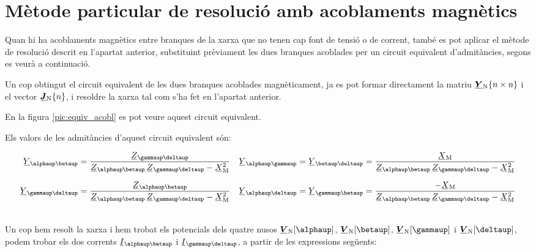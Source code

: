 \section{Mètode particular de resolució amb acoblaments magnètics}

Quan hi ha acoblaments magnètics entre branques de la xarxa que no
tenen cap font de tensió o de corrent, també es pot aplicar el
mètode de resolució descrit en l'apartat anterior, substituint
prèviament les dues branques acoblades per un circuit equivalent
d'admitàncies, segons es veurà a continuació. 

Un cop obtingut el circuit equivalent de les dues branques acoblades
magnèticament, ja es pot formar directament la matriu $\mcmplx{Y}\ped{N}\{n \times n\}$ i
el vector $\mcmplx{J}\ped{N}\{n\}$, i  resoldre la xarxa tal com s'ha fet en
l'apartat anterior.

En la figura \vref{pic:equiv_acobl} es pot veure aquest circuit
equivalent.
\begin{center}
\centering
   
    \label{pic:equiv_acobl}
\end{center}

Els valors de les admitàncies d'aquest circuit equivalent
són:

\parbox{15cm}
{ \begin{align*}
   \cmplx{Y}_{\alphaup\betaup} &= \frac{\cmplx{Z}_{\gammaup\deltaup}}{\cmplx{Z}_{\alphaup\betaup}\, \cmplx{Z}_{\gammaup\deltaup}-\cmplx{X}\ped{M}^2} &
   \cmplx{Y}_{\alphaup\gammaup} &= \cmplx{Y}_{\betaup\deltaup} = \frac{\cmplx{X}\ped{M}}{\cmplx{Z}_{\alphaup\betaup}\, \cmplx{Z}_{\gammaup\deltaup}-\cmplx{X}\ped{M}^2} \\[1.5ex]
   \cmplx{Y}_{\gammaup\deltaup} &= \frac{\cmplx{Z}_{\alphaup\betaup}}{\cmplx{Z}_{\alphaup\betaup}\, \cmplx{Z}_{\gammaup\deltaup}-\cmplx{X}\ped{M}^2} &
   \cmplx{Y}_{\alphaup\deltaup} &= \cmplx{Y}_{\gammaup\betaup} = \frac{-\cmplx{X}\ped{M}}{\cmplx{Z}_{\alphaup\betaup}\, \cmplx{Z}_{\gammaup\deltaup}-\cmplx{X}\ped{M}^2}
\end{align*} }
\hfill
\parbox{1cm}{\begin{align}\end{align}}

Un cop hem resolt la xarxa i hem trobat els potencials dels quatre
nusos $\mcmplx{V}\ped{N}[\alphaup]$, $\mcmplx{V}\ped{N}[\betaup]$,
$\mcmplx{V}\ped{N}[\gammaup]$ i $\mcmplx{V}\ped{N}[\deltaup]$, podem
trobar els dos corrents $\cmplx{I}_{\alphaup\betaup}$ i
$\cmplx{I}_{\gammaup\deltaup}$, a partir de les expressions següents:

